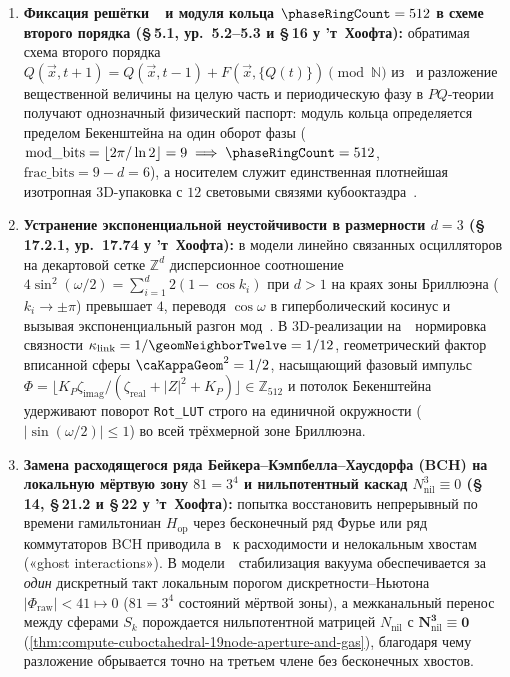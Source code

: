 \begin{enumerate}[leftmargin=*]
\item \textbf{Фиксация решётки~\latGCKshort\ и модуля кольца $\phaseRingCount = 512$ в схеме второго порядка (\S\,5.1, ур.~5.2--5.3 и \S\,16 у ’т~Хоофта):}
  обратимая схема второго порядка $Q(\vec{x},t+1) = Q(\vec{x},t-1) + F(\vec{x},\{Q(t)\}) \pmod{\mathbb{N}}$ из~\textcite[\S\,5.1]{tHooft2016} и разложение вещественной величины на целую часть и периодическую фазу в $PQ$-теории~\textcite[\S\,16, с.~147]{tHooft2016} получают однозначный физический паспорт: модуль кольца определяется пределом Бекенштейна на один оборот фазы ($\mathrm{mod\_bits} = \lfloor 2\pi/\ln 2\rfloor = 9 \implies \phaseRingCount = 512$, $\mathrm{frac\_bits} = 9 - d = 6$), а носителем служит единственная плотнейшая изотропная 3D-упаковка с $12$ световыми связями кубооктаэдра~\latGCKshort.
\item \textbf{Устранение экспоненциальной неустойчивости в размерности $d = 3$ (\S\,17.2.1, ур.~17.74 у ’т~Хоофта):}
  в модели линейно связанных осцилляторов на декартовой сетке $\mathbb{Z}^d$ дисперсионное соотношение $4\sin^2(\omega/2) = \sum_{i=1}^d 2(1-\cos k_i)$ при $d > 1$ на краях зоны Бриллюэна ($k_i \to \pm\pi$) превышает $4$, переводя $\cos\omega$ в гиперболический косинус и вызывая экспоненциальный разгон мод~\textcite[с.~170]{tHooft2016}.
  В 3D-реализации на~\latGCKshort\ нормировка связности $\kappa_{\mathrm{link}} = 1/\geomNeighborTwelve = 1/12$, геометрический фактор вписанной сферы $\caKappaGeom^2 = 1/2$, насыщающий фазовый импульс $\Phi = \lfloor K_P\zeta_{\mathrm{imag}}/(\zeta_{\mathrm{real}} + |Z|^2 + K_P)\rfloor \in \mathbb{Z}_{512}$ и потолок Бекенштейна удерживают поворот \texttt{Rot\_LUT} строго на единичной окружности ($|\sin(\omega/2)| \le 1$) во всей трёхмерной зоне Бриллюэна.
\item \textbf{Замена расходящегося ряда Бейкера--Кэмпбелла--Хаусдорфа (BCH) на локальную мёртвую зону $81 = 3^4$ и нильпотентный каскад $N_{\mathrm{nil}}^3 \equiv 0$ (\S\,14, \S\,21.2 и \S\,22 у ’т~Хоофта):}
  попытка восстановить непрерывный по времени гамильтониан $H_{\mathrm{op}}$ через бесконечный ряд Фурье или ряд коммутаторов BCH приводила в~\textcite[с.~124, 234, 238]{tHooft2016} к расходимости и нелокальным хвостам («ghost interactions»).
  В модели~\latGCKshort\ стабилизация вакуума обеспечивается за \emph{один} дискретный такт локальным порогом дискретности--Ньютона $|\Phi_{\mathrm{raw}}| < 41 \mapsto 0$ ($81 = 3^4$ состояний мёртвой зоны), а межканальный перенос между сферами $S_k$ порождается нильпотентной матрицей $N_{\mathrm{nil}}$ с $\mathbf{N_{\mathrm{nil}}^3 \equiv 0}$ (\cref{thm:compute-cuboctahedral-19node-aperture-and-gas}), благодаря чему разложение обрывается точно на третьем члене без бесконечных хвостов.

\end{enumerate}
